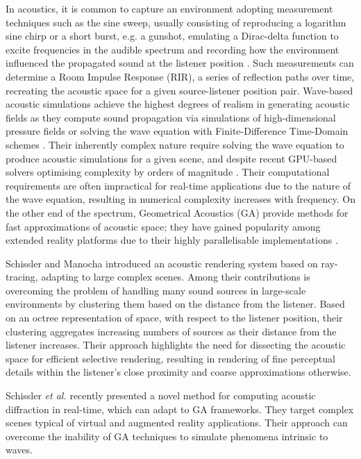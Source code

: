 In acoustics, it is common to capture an environment adopting measurement techniques such as the sine sweep, usually consisting of reproducing a logarithm sine chirp or a short burst, e.g. a gunshot,  emulating a Dirac-delta function to excite frequencies in the audible spectrum and recording how the environment influenced the propagated sound at the listener position \cite{reilly1995convolution}. Such measurements can determine a Room Impulse Response (RIR), a series of reflection paths over time, recreating the acoustic space for a given source-listener position pair. Wave-based acoustic simulations achieve the highest degrees of realism in generating acoustic fields as they compute sound propagation via simulations of high-dimensional pressure fields \cite{raghuvanshi2014parametric} or solving the wave equation with Finite-Difference Time-Domain schemes \cite{hamilton2017fdtd}. Their inherently complex nature require solving the wave equation to produce acoustic simulations for a given scene, and despite recent GPU-based solvers optimising complexity by orders of magnitude \cite{mehra2012efficient}. Their computational requirements are often impractical for real-time applications due to the nature of the wave equation, resulting in numerical complexity increases with frequency. On the other end of the spectrum, Geometrical Acoustics (GA) provide methods for fast approximations of acoustic space; they have gained popularity among extended reality platforms due to their highly parallelisable implementations \cite{savioja2015overview}.\par
Schissler and Manocha \cite{schissler2016interactive} introduced an acoustic rendering system based on ray-tracing, adapting to large complex scenes. Among their contributions is overcoming the problem of handling many sound sources in large-scale environments by clustering them based on the distance from the listener. Based on an octree representation of space, with respect to the listener position, their clustering aggregates increasing numbers of sources as their distance from the listener increases. Their approach highlights the need for dissecting the acoustic space for efficient selective rendering, resulting in rendering of fine perceptual details within the listener's close proximity and coarse approximations otherwise. \par

Schissler \textit{et al.} \cite{schissler2021fast} recently presented a novel method for computing acoustic diffraction in real-time, which can adapt to GA frameworks. They target complex scenes typical of virtual and augmented reality applications. Their approach can overcome the inability of GA techniques to simulate phenomena intrinsic to waves.\par

